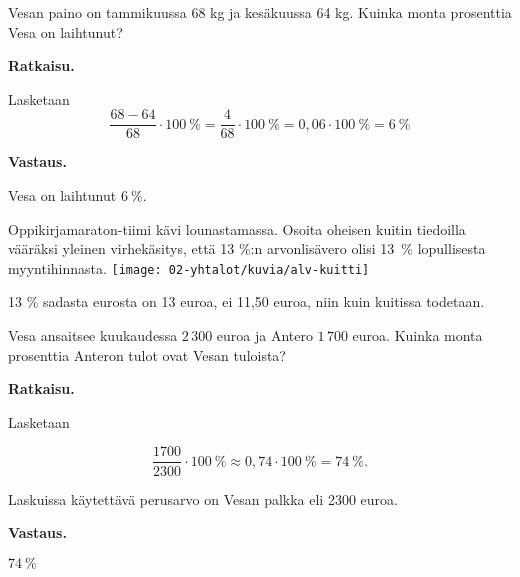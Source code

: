 \begin{esimerkki}
Vesan paino on tammikuussa 68 kg ja kesäkuussa 64 kg. Kuinka monta prosenttia Vesa on laihtunut?

\textbf{Ratkaisu.}

Lasketaan 
\begin{equation*}
\frac{68-64}{68}\cdot 100\ \% = \frac{4}{68} \cdot 100\ \%=0,06\cdot 100\ \% = 6\ \%
\end{equation*}

\textbf{Vastaus.}

Vesa on laihtunut $6\ \%$.
\end{esimerkki}

\begin{tehtava}

Oppikirjamaraton-tiimi kävi lounastamassa. Osoita oheisen kuitin tiedoilla vääräksi yleinen virhekäsitys, että 13 \%:n arvonlisävero olisi 13~\% lopullisesta myyntihinnasta.
\texttt{[image: 02-yhtalot/kuvia/alv-kuitti]}

\begin{vastaus}
13 \% sadasta eurosta on 13 euroa, ei 11,50 euroa, niin kuin kuitissa todetaan.
\end{vastaus}


\end{tehtava}



\begin{esimerkki}
Vesa ansaitsee kuukaudessa ${2\,300}$ euroa ja Antero ${1\,700}$ euroa. Kuinka monta prosenttia Anteron tulot ovat Vesan tuloista? 

\textbf{Ratkaisu.}

Lasketaan

\begin{equation*}
\frac{1700}{2300} \cdot 100\ \%  \approx 0,74\cdot 100\ \% = 74 \  \%.
\end{equation*}

Laskuissa käytettävä perusarvo on Vesan palkka eli 2300 euroa.
    
\textbf{Vastaus.}

$74~\%$
\end{esimerkki}



